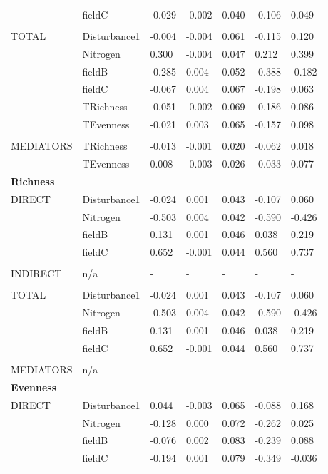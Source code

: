 \begin{longtable}[c]{l l l l l l l }
 & fieldC & -0.029 & -0.002 & 0.040 & -0.106 & 0.049\\
 & & & & & & \\
 TOTAL & Disturbance1 & -0.004 & -0.004 & 0.061 & -0.115 & 0.120\\
 & Nitrogen & 0.300 & -0.004 & 0.047 & 0.212 & 0.399\\
 & fieldB & -0.285 & 0.004 & 0.052 & -0.388 & -0.182\\
 & fieldC & -0.067 & 0.004 & 0.067 & -0.198 & 0.063\\
 & TRichness & -0.051 & -0.002 & 0.069 & -0.186 & 0.086\\
 & TEvenness & -0.021 & 0.003 & 0.065 & -0.157 & 0.098\\
 & & & & & & \\
 MEDIATORS &TRichness & -0.013 & -0.001 & 0.020 & -0.062 & 0.018\\
 & TEvenness & 0.008 & -0.003 & 0.026 & -0.033 & 0.077\\
\textbf{Richness} &  &  &  &  &  &\\
\hline
 DIRECT & Disturbance1 & -0.024 & 0.001 & 0.043 & -0.107 & 0.060\\
 & Nitrogen & -0.503 & 0.004 & 0.042 & -0.590 & -0.426\\
 & fieldB & 0.131 & 0.001 & 0.046 & 0.038 & 0.219\\
 & fieldC & 0.652 & -0.001 & 0.044 & 0.560 & 0.737\\
 & & & & & & \\
 INDIRECT & n/a & - & - & - & - & -\\
 & & & & & & \\
 TOTAL & Disturbance1 & -0.024 & 0.001 & 0.043 & -0.107 & 0.060\\
 & Nitrogen & -0.503 & 0.004 & 0.042 & -0.590 & -0.426\\
 & fieldB & 0.131 & 0.001 & 0.046 & 0.038 & 0.219\\
 & fieldC & 0.652 & -0.001 & 0.044 & 0.560 & 0.737\\
 & & & & & & \\
 MEDIATORS &n/a & - & - & - & - & -\\
\textbf{Evenness} &  &  &  &  &  &\\
\hline
 DIRECT & Disturbance1 & 0.044 & -0.003 & 0.065 & -0.088 & 0.168\\
 & Nitrogen & -0.128 & 0.000 & 0.072 & -0.262 & 0.025\\
 & fieldB & -0.076 & 0.002 & 0.083 & -0.239 & 0.088\\
 & fieldC & -0.194 & 0.001 & 0.079 & -0.349 & -0.036\\

\end{longtable}
